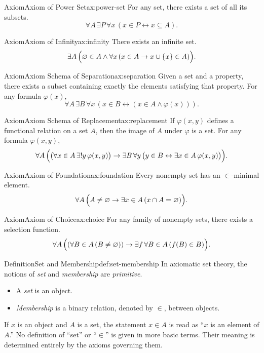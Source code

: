 \documentclass[11pt]{article}
\begin{document}
\begin{studyblock}{Axiom}{Axiom of Power Set}{ax:power-set}
For any set, there exists a set of all its subsets.
\[
\forall A \, \exists P \,
\forall x \, (x \in P \leftrightarrow x \subseteq A).
\]
\end{studyblock}
\begin{studyblock}{Axiom}{Axiom of Infinity}{ax:infinity}
There exists an infinite set.
\[
\exists A \,
\Bigl( \varnothing \in A \land
\forall x \, (x \in A \rightarrow x \cup \{x\} \in A) \Bigr).
\]
\end{studyblock}
\begin{studyblock}{Axiom}{Axiom Schema of Separation}{ax:separation}
Given a set and a property, there exists a subset containing exactly the
elements satisfying that property. For any formula $\varphi(x)$,
\[
\forall A \, \exists B \,
\forall x \, (x \in B \leftrightarrow (x \in A \land \varphi(x))).
\]
\end{studyblock}
\begin{studyblock}{Axiom}{Axiom Schema of Replacement}{ax:replacement}
If $\varphi(x,y)$ defines a functional relation on a set $A$, then the image
of $A$ under $\varphi$ is a set. For any formula $\varphi(x,y)$,
\[
\forall A\,
\Bigl(
\bigl(\forall x \in A\, \exists! y\, \varphi(x,y)\bigr)
\rightarrow
\exists B\, \forall y\,
\bigl(y \in B \leftrightarrow \exists x \in A\, \varphi(x,y)\bigr)
\Bigr).
\]
\end{studyblock}
\begin{studyblock}{Axiom}{Axiom of Foundation}{ax:foundation}
Every nonempty set has an $\in$-minimal element.
\[
\forall A \,
\Bigl( A \neq \varnothing \rightarrow
\exists x \in A \, (x \cap A = \varnothing) \Bigr).
\]
\end{studyblock}
\begin{studyblock}{Axiom}{Axiom of Choice}{ax:choice}
For any family of nonempty sets, there exists a selection function.
\[
\forall A \,
\Bigl(
(\forall B \in A \, (B \neq \varnothing))
\rightarrow
\exists f \,
\forall B \in A \, (f(B) \in B)
\Bigr).
\]
\end{studyblock}
\begin{studyblock}{Definition}{Set and Membership}{def:set-membership}
In axiomatic set theory, the notions of \emph{set} and \emph{membership} are
\emph{primitive}.

\begin{itemize}
  \item A \emph{set} is an object.
  \item \emph{Membership} is a binary relation, denoted by $\in$, between objects.
\end{itemize}

If $x$ is an object and $A$ is a set, the statement $x \in A$ is read as
``$x$ is an element of $A$.'' No definition of ``set'' or ``$\in$'' is given
in more basic terms. Their meaning is determined entirely by the axioms
governing them.
\end{studyblock}
\end{document}
